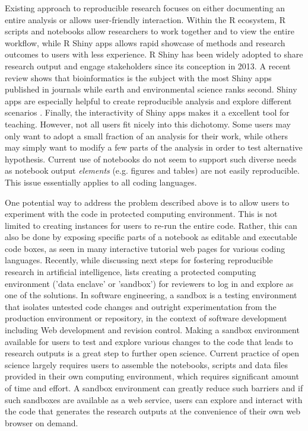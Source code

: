 Existing approach to reproducible research focuses on either documenting
an entire analysis or allows user-friendly interaction. Within the R
ecosystem, R scripts and notebooks allow researchers to work together
and to view the entire workflow, while R Shiny apps \citep{shiny}
allows rapid showcase of methods and research outcomes to users with
less experience. R Shiny has been widely adopted to share research
output and engage stakeholders since its conception in 2013. A recent
review \citep{Kasprzak} shows that bioinformatics is the subject with
the most Shiny apps published in journals while earth and environmental
science ranks second. Shiny apps are especially helpful to create
reproducible analysis \citep[e.g. examples in][]{Hollaway2020} and
explore different scenarios \citep[e.g.][]{Whateley2015, Mose2018}.
Finally, the interactivity of Shiny apps makes it a excellent tool for
teaching\citep[e.g.][]{Williams2017, adventr}. However, not all users
fit nicely into this dichotomy. Some users may only want to adopt a
small fraction of an analysis for their work, while others may simply
want to modify a few parts of the analysis in order to test alternative
hypothesis. Current use of notebooks do not seem to support such diverse
needs as notebook output \textit{elements} (e.g. figures and tables) are
not easily reproducible. This issue essentially applies to all coding
languages.

One potential way to address the problem described above is to allow
users to experiment with the code in protected computing environment.
This is not limited to creating instances for users to re-run the entire
code. Rather, this can also be done by exposing specific parts of a
notebook as editable and executable code boxes, as seen in many
interactive tutorial web pages for various coding languages. Recently,
while discussing next steps for fostering reproducible research in
artificial intelligence, \citet{Carter2019} lists creating a protected
computing environment ('data enclave' or 'sandbox') for reviewers to log
in and explore as one of the solutions. In software engineering, a
sandbox is a testing environment that isolates untested code changes and
outright experimentation from the production environment or repository,
in the context of software development including Web development and
revision control. Making a sandbox environment available for users to
test and explore various changes to the code that leads to research
outputs is a great step to further open science. Current practice of
open science largely requires users to assemble the notebooks, scripts
and data files provided in their own computing environment, which
requires significant amount of time and effort. A sandbox environment
can greatly reduce such barriers and if such sandboxes are available as
a web service, users can explore and interact with the code that
generates the research outputs at the convenience of their own web browser
on demand.

